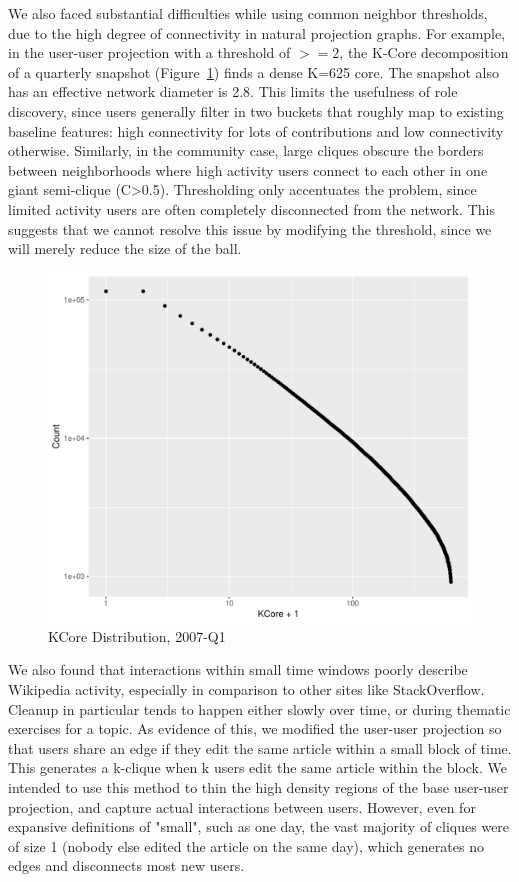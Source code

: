 \documentclass[letterpaper, 12pt, conference]{ieeeconf}
\begin{document}
We also faced substantial difficulties while using common neighbor thresholds, due to the high degree of connectivity in natural projection graphs. For example, in the user-user projection with a threshold of $>=2$, the K-Core decomposition of a quarterly snapshot (Figure~\ref{fig:kcore_2007_1}) finds a dense K=625 core. The snapshot also has an effective network diameter is 2.8. This limits the usefulness of role discovery, since users generally filter in two buckets that roughly map to existing baseline features: high connectivity for lots of contributions and low connectivity otherwise. Similarly, in the community case, large cliques obscure the borders between neighborhoods where high activity users connect to each other in one giant semi-clique (C>0.5). Thresholding only accentuates the problem, since limited activity users are often completely disconnected from the network. This suggests that we cannot resolve this issue by modifying the threshold, since we will merely reduce the size of the ball.

\begin{figure}[ht]
    \centering
    \includegraphics[width=1\linewidth]{kcore_dist_2007_1.pdf}
    \caption{KCore Distribution, 2007-Q1}
    \label{fig:kcore_2007_1}
\end{figure}

We also found that interactions within small time windows poorly describe Wikipedia activity, especially in comparison to other sites like StackOverflow. Cleanup in particular tends to happen either slowly over time, or during thematic exercises for a topic. As evidence of this, we modified the user-user projection so that users share an edge if they edit the same article within a small block of time. This generates a k-clique when k users edit the same article within the block. We intended to use this method to thin the high density regions of the base user-user projection, and capture actual interactions between users. However, even for expansive definitions of "small", such as one day, the vast majority of cliques were of size 1 (nobody else edited the article on the same day), which generates no edges and disconnects most new users.
\end{document}
